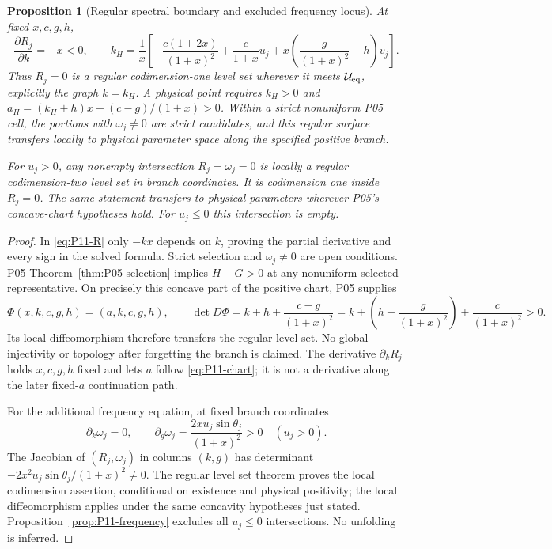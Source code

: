 \documentclass[11pt]{article}
\newtheorem{proposition}[theorem]{Proposition}
\theoremstyle{definition}
\theoremstyle{remark}
\begin{document}
\begin{proposition}[Regular spectral boundary and excluded frequency locus]
\label{prop:P11-surface}
At fixed $x,c,g,h$,
\begin{equation}
 \frac{\partial R_j}{\partial k}=-x<0,
 \qquad
 k_H=\frac1x\left[-\frac{c(1+2x)}{(1+x)^2}
       +\frac{c}{1+x}u_j
       +x\left(\frac{g}{(1+x)^2}-h\right)v_j\right].
 \label{eq:P11-kH}
\end{equation}
Thus $R_j=0$ is a regular codimension-one level set wherever it
meets $\mathcal U_{\rm eq}$, explicitly the graph $k=k_H$.
A physical point requires $k_H>0$ and
$a_H=(k_H+h)x-(c-g)/(1+x)>0$. Within a strict nonuniform
P05 cell, the portions with $\omega_j\ne0$ are strict candidates,
and this regular surface transfers locally to physical parameter space
along the specified positive branch.

For $u_j>0$, any nonempty intersection $R_j=\omega_j=0$ is
locally a regular codimension-two level set in branch coordinates.
It is codimension one inside $R_j=0$. The same statement transfers
to physical parameters wherever P05's concave-chart hypotheses hold.
For $u_j\le0$ this intersection is empty.
\end{proposition}
\begin{proof}
In \eqref{eq:P11-R} only $-kx$ depends on $k$, proving the
partial derivative and every sign in the solved formula. Strict
selection and $\omega_j\ne0$ are open conditions.
P05 Theorem~\ref{thm:P05-selection} implies $H-G>0$ at any
nonuniform selected representative. On precisely this concave part
of the positive chart, P05 supplies
\[
 \Phi(x,k,c,g,h)=(a,k,c,g,h),\qquad
 \det D\Phi=k+h+\frac{c-g}{(1+x)^2}
     =k+\left(h-\frac{g}{(1+x)^2}\right)
         +\frac{c}{(1+x)^2}>0.
\]
Its local diffeomorphism therefore transfers the regular level set.
No global injectivity or topology after forgetting the branch is claimed.
The derivative $\partial_k R_j$ holds $x,c,g,h$ fixed and lets $a$
follow \eqref{eq:P11-chart}; it is not a derivative along the later
fixed-$a$ continuation path.

For the additional frequency equation, at fixed branch coordinates
\[
 \partial_k\omega_j=0,\qquad
 \partial_g\omega_j=\frac{2xu_j\sin\theta_j}{(1+x)^2}>0
 \quad(u_j>0).
\]
The Jacobian of $(R_j,\omega_j)$ in columns $(k,g)$ has determinant
$-2x^2u_j\sin\theta_j/(1+x)^2\ne0$. The regular level set theorem
proves the local codimension assertion, conditional on existence and
physical positivity; the local diffeomorphism applies under the same
concavity hypotheses just stated. Proposition~\ref{prop:P11-frequency}
excludes all $u_j\le0$ intersections. No unfolding is inferred.
\end{proof}
\end{document}
